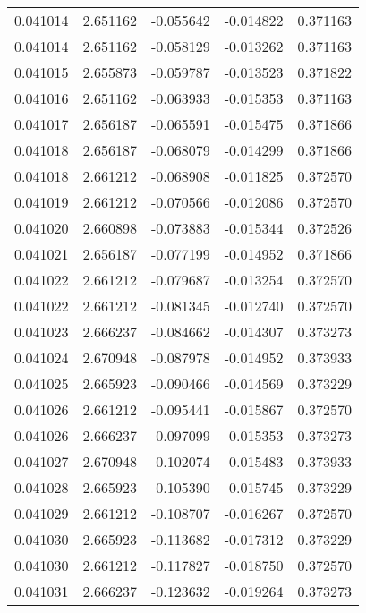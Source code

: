 \begin{tabular}{lrrrr}
0.041014    &  2.651162 & -0.055642 & -0.014822 &             0.371163 \\
0.041014    &  2.651162 & -0.058129 & -0.013262 &             0.371163 \\
0.041015    &  2.655873 & -0.059787 & -0.013523 &             0.371822 \\
0.041016    &  2.651162 & -0.063933 & -0.015353 &             0.371163 \\
0.041017    &  2.656187 & -0.065591 & -0.015475 &             0.371866 \\
0.041018    &  2.656187 & -0.068079 & -0.014299 &             0.371866 \\
0.041018    &  2.661212 & -0.068908 & -0.011825 &             0.372570 \\
0.041019    &  2.661212 & -0.070566 & -0.012086 &             0.372570 \\
0.041020    &  2.660898 & -0.073883 & -0.015344 &             0.372526 \\
0.041021    &  2.656187 & -0.077199 & -0.014952 &             0.371866 \\
0.041022    &  2.661212 & -0.079687 & -0.013254 &             0.372570 \\
0.041022    &  2.661212 & -0.081345 & -0.012740 &             0.372570 \\
0.041023    &  2.666237 & -0.084662 & -0.014307 &             0.373273 \\
0.041024    &  2.670948 & -0.087978 & -0.014952 &             0.373933 \\
0.041025    &  2.665923 & -0.090466 & -0.014569 &             0.373229 \\
0.041026    &  2.661212 & -0.095441 & -0.015867 &             0.372570 \\
0.041026    &  2.666237 & -0.097099 & -0.015353 &             0.373273 \\
0.041027    &  2.670948 & -0.102074 & -0.015483 &             0.373933 \\
0.041028    &  2.665923 & -0.105390 & -0.015745 &             0.373229 \\
0.041029    &  2.661212 & -0.108707 & -0.016267 &             0.372570 \\
0.041030    &  2.665923 & -0.113682 & -0.017312 &             0.373229 \\
0.041030    &  2.661212 & -0.117827 & -0.018750 &             0.372570 \\
0.041031    &  2.666237 & -0.123632 & -0.019264 &             0.373273 \\

\end{tabular}
